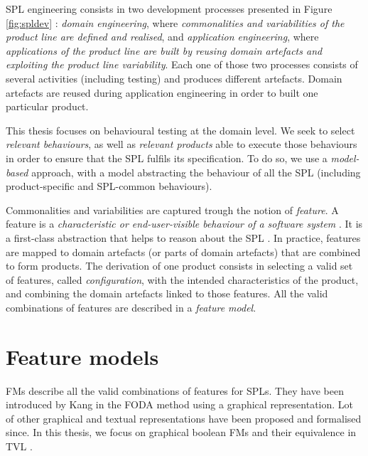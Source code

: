 \gls{SPL} engineering consists in two development processes presented in Figure \ref{fig:spldev} \cite{Pohl2005}: \emph{domain engineering}, where \textit{commonalities and variabilities of the product line are defined and realised}, and \emph{application engineering}, where \textit{applications of the product line are built by reusing domain artefacts and exploiting the product line variability}. Each one of those two processes consists of several activities (including testing) and produces different artefacts. Domain artefacts are reused during application engineering in order to built one particular product. 

This thesis focuses on behavioural testing at the domain level. We seek to select \emph{relevant behaviours}, as well as \emph{relevant products} able to execute those behaviours in order to ensure that the \gls{SPL} fulfils its specification. To do so, we use a \emph{model-based} approach, with a model abstracting the behaviour of all the \gls{SPL} (including product-specific and SPL-common behaviours).

Commonalities and variabilities are captured trough the notion of \emph{feature}. A feature is a \textit{characteristic or end-user-visible behaviour of a software system} \cite{Apel2013}. It is a first-class abstraction that helps to reason about the \gls{SPL} \cite{Classen2008}. In practice, features are mapped to domain artefacts (or parts of domain artefacts) that are combined to form products. The derivation of one product consists in selecting a valid set of features, called \emph{configuration}, with the intended characteristics of the product, and combining the domain artefacts linked to those features. All the valid combinations of features are described in a \emph{feature model}.


\section{Feature models}

\label{sec:features}


\glspl{FM} describe all the valid combinations of features for \glspl{SPL}. They have been introduced by Kang \etal in the \gls{FODA} method \cite{Kang1990} using a graphical representation. Lot of other graphical \cite{Antkiewicz2004,Trinidad2008,Beuche2013,Leich2005} and textual \cite{Mendonca2009,Classen2011a} representations have been proposed and formalised \cite{Schobbens2007,Batory2005} since. In this thesis, we focus on graphical boolean \glspl{FM} and their equivalence in \gls{TVL} \cite{Classen2011a}. 

